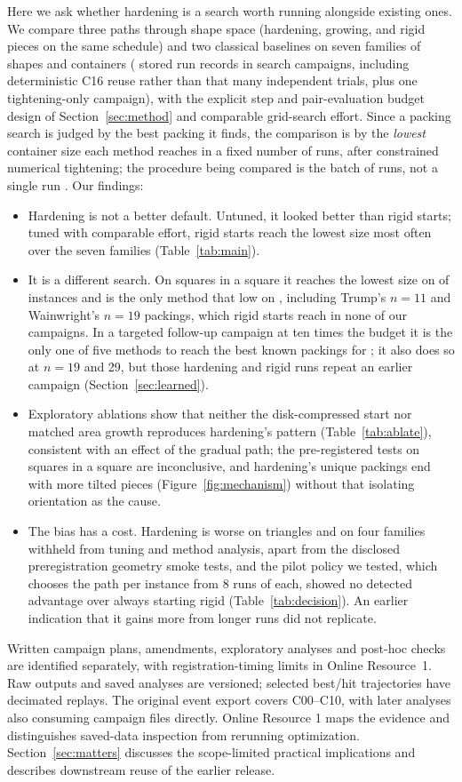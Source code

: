 Here we ask whether hardening is a search worth running alongside existing ones. We compare three paths through shape space (hardening, growing, and rigid pieces on the same schedule) and two classical baselines on seven families of shapes and containers (\totalruns{} stored run records in \ncampaigns{} search campaigns, including deterministic C16 reuse rather than that many independent trials, plus one tightening-only campaign), with the explicit step and pair-evaluation budget design of Section~\ref{sec:method} and comparable grid-search effort. Since a packing search is judged by the best packing it finds, the comparison is by the \emph{lowest} container size each method reaches in a fixed number of runs, after constrained numerical tightening; the procedure being compared is the batch of runs, not a single run \citep{Birattari2005}. Our findings:
\begin{itemize}\itemsep1pt
\item Hardening is not a better default. Untuned, it looked better than rigid starts; tuned with comparable effort, rigid starts reach the lowest size most often over the seven families (Table~\ref{tab:main}).
\item It is a different search. On squares in a square it reaches the lowest size on \CsevenSquInSquHardenLowest{} of \CsevenSquInSquN{} instances and is the only method that low on \CsevenSquInSquHardenSole, including Trump's $n=11$ and Wainwright's $n=19$ packings, which rigid starts reach in none of our campaigns. In a targeted follow-up campaign at ten times the budget it is the only one of five methods to reach the best known packings for \LongHardenOnlyReachedNewNs; it also does so at $n=19$ and 29, but those hardening and rigid runs repeat an earlier campaign (Section~\ref{sec:learned}).
\item Exploratory ablations show that neither the disk-compressed start nor matched area growth reproduces hardening's pattern (Table~\ref{tab:ablate}), consistent with an effect of the gradual path; the pre-registered tests on squares in a square are inconclusive, and hardening's unique packings end with more tilted pieces (Figure~\ref{fig:mechanism}) without that isolating orientation as the cause.
\item The bias has a cost. Hardening is worse on triangles and on four families withheld from tuning and method analysis, apart from the disclosed preregistration geometry smoke tests, and the pilot policy we tested, which chooses the path per instance from 8 runs of each, showed no detected advantage over always starting rigid (Table~\ref{tab:decision}). An earlier indication that it gains more from longer runs did not replicate.
\end{itemize}
Written campaign plans, amendments, exploratory analyses and post-hoc checks are identified separately, with registration-timing limits in Online Resource~1. Raw outputs and saved analyses are versioned; selected best/hit trajectories have decimated replays. The original event export covers C00--C10, with later analyses also consuming campaign files directly. Online Resource 1 maps the evidence and distinguishes saved-data inspection from rerunning optimization. Section~\ref{sec:matters} discusses the scope-limited practical implications and describes downstream reuse of the earlier release.
